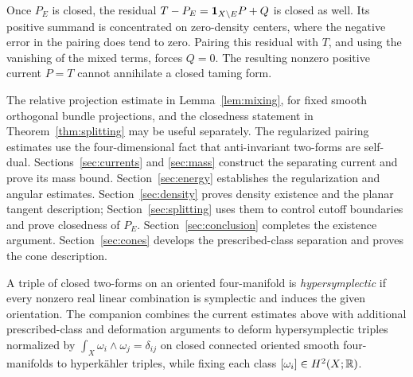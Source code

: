Once \(P_E\) is closed, the residual
\(T-P_E=\mathbf 1_{X\setminus E}P+Q\) is closed as well. Its positive
summand is concentrated on zero-density centers, where the
negative error in the pairing does tend to zero. Pairing this residual
with \(T\), and using the vanishing of the mixed terms, forces
\(Q=0\). The resulting nonzero positive current \(P=T\)
cannot annihilate a closed taming form.

The relative projection estimate in Lemma~\ref{lem:mixing}, for
fixed smooth orthogonal bundle projections, and the closedness
statement in Theorem~\ref{thm:splitting} may be useful separately.
The regularized pairing estimates use the four-dimensional fact
that anti-invariant two-forms are self-dual.
Sections~\ref{sec:currents} and \ref{sec:mass} construct the
separating current and prove its mass bound.
Section~\ref{sec:energy} establishes the regularization and
angular estimates. Section~\ref{sec:density} proves density
existence and the planar tangent description;
Section~\ref{sec:splitting} uses them to control cutoff boundaries
and prove closedness of \(P_E\).
Section~\ref{sec:conclusion} completes the existence argument.
Section~\ref{sec:cones} develops the prescribed-class separation
and proves the cone description.

A triple of closed two-forms on an oriented four-manifold is
\emph{hypersymplectic} if every nonzero real linear combination is
symplectic and induces the given orientation. The companion
\cite[Theorem~1.1]{OpenAIHypersymplectic2026} combines the current
estimates above with additional prescribed-class and deformation
arguments to deform hypersymplectic triples normalized by
\(\int_X\omega_i\wedge\omega_j=\delta_{ij}\) on closed connected oriented
smooth four-manifolds to hyperk\"ahler triples, while fixing each class
\([\omega_i]\in H^2(X;\mathbb R)\).
